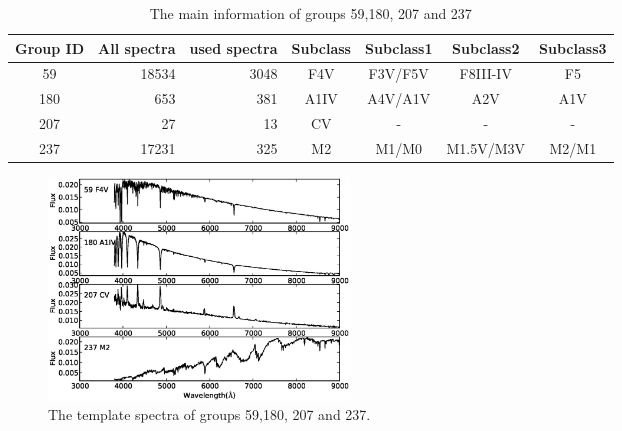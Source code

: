 \documentclass[referee]{raa}            %
\begin{document}
\begin{table}
\bc
\begin{minipage}[]{100mm}
\caption[]{The main information of groups 59,180, 207 and 237\label{tab2}}\end{minipage}
\setlength{\tabcolsep}{1pt}
\small
 \begin{tabular}{c|r|r|c|c|c|c}
  \hline\hline
Group ID&All spectra&used spectra&Subclass&Subclass1&Subclass2&Subclass3\\
  \hline
59  &18534    &3048  &F4V    &F3V/F5V  &F8III-IV &F5   \\
180 &653    &381  &A1IV    &A4V/A1V  &A2V&A1V    \\
207 &27     &13  &CV    &-  &-&-    \\
237 &17231     &325  &M2    &M1/M0  &M1.5V/M3V&M2/M1    \\
 \hline\hline
\end{tabular}
\ec
\end{table}
 \begin{figure}
   \centering
   \includegraphics[width=8cm, angle=0,clip]{f6.eps}
   \caption{The template spectra of groups 59,180, 207 and 237.
   }
   \label{Fig6}
\end{figure}
\end{document}
